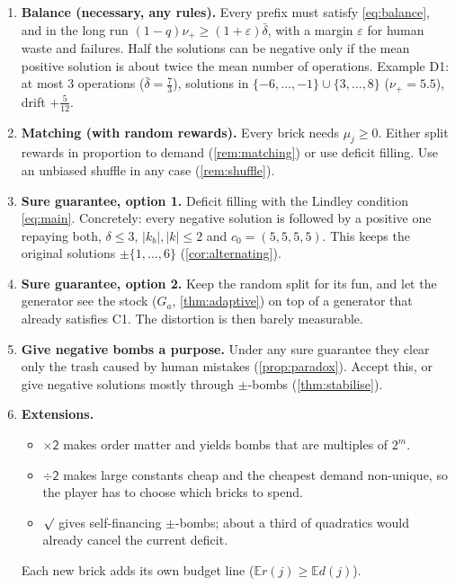 \documentclass[11pt,a4paper]{article}
\theoremstyle{definition}
\theoremstyle{remark}
\newcommand{\E}{\mathbb{E}}
\newcommand{\dbl}{\ensuremath{\mathord{\times}\mathsf{2}}}
\newcommand{\hlv}{\ensuremath{\mathord{\div}\mathsf{2}}}
\newcommand{\sq}{\ensuremath{\surd}}
\newcommand{\abs}[1]{\lvert #1\rvert}
\begin{document}
\begin{enumerate}[label=\textbf{C\arabic*.},leftmargin=*]
\item \textbf{Balance (necessary, any rules).} Every prefix must satisfy
  \eqref{eq:balance}, and in the long run $(1-q)\nu_+\ge(1+\varepsilon)\bar\delta$,
  with a margin $\varepsilon$ for human waste and failures. Half the solutions can be
  negative only if the mean positive solution is about twice the mean number of
  operations. Example D1: at most 3 operations ($\bar\delta=\frac73$), solutions in
  $\{-6,\dots,-1\}\cup\{3,\dots,8\}$ ($\nu_+=5.5$), drift $+\frac5{12}$.
\item \textbf{Matching (with random rewards).} Every brick needs $\mu_j\ge0$. Either
  split rewards in proportion to demand (\cref{rem:matching}) or use deficit filling.
  Use an unbiased shuffle in any case (\cref{rem:shuffle}).
\item \textbf{Sure guarantee, option 1.} Deficit filling with the Lindley condition
  \eqref{eq:main}. Concretely: every negative solution is followed by a positive one
  repaying both, $\delta\le3$, $\abs{k_b},\abs k\le2$ and $c_0=(5,5,5,5)$. This keeps
  the original solutions $\pm\{1,\dots,6\}$ (\cref{cor:alternating}).
\item \textbf{Sure guarantee, option 2.} Keep the random split for its fun, and let the
  generator see the stock ($G_a$, \cref{thm:adaptive}) on top of a generator that already
  satisfies C1. The distortion is then barely measurable.
\item \textbf{Give negative bombs a purpose.} Under any sure guarantee they clear only
  the trash caused by human mistakes (\cref{prop:paradox}). Accept this, or give
  negative solutions mostly through $\pm$-bombs (\cref{thm:stabilise}).
\item \textbf{Extensions.}
  \begin{itemize}[nosep]
  \item $\dbl$ makes order matter and yields bombs that are multiples of $2^m$.
  \item $\hlv$ makes large constants cheap and the cheapest demand non-unique, so the
    player has to choose which bricks to spend.
  \item $\sq$ gives self-financing $\pm$-bombs; about a third of quadratics would already
    cancel the current deficit.
  \end{itemize}
  Each new brick adds its own budget line ($\E r(j)\ge\E d(j)$).
\end{enumerate}
\end{document}
